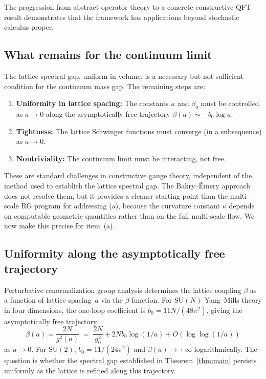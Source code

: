 \documentclass[11pt,a4paper]{article}
\theoremstyle{plain}
\theoremstyle{definition}
\theoremstyle{remark}
\newcommand{\SU}{\mathrm{SU}}
\begin{document}
The progression from abstract operator theory to a concrete
constructive QFT result demonstrates that the framework has
applications beyond stochastic calculus proper.


\subsection{What remains for the continuum limit}

The lattice spectral gap, uniform in volume, is a necessary but not
sufficient condition for the continuum mass gap. The remaining steps
are:
\begin{enumerate}[label=(\alph*)]
\item \textbf{Uniformity in lattice spacing:} The constants $\kappa$
  and $\beta_0$ must be controlled as $a \to 0$ along the
  asymptotically free trajectory $\beta(a) \sim -b_0\log a$.
\item \textbf{Tightness:} The lattice Schwinger functions must
  converge (in a subsequence) as $a \to 0$.
\item \textbf{Nontriviality:} The continuum limit must be
  interacting, not free.
\end{enumerate}

These are standard challenges in constructive gauge theory,
independent of the method used to establish the lattice spectral gap.
The Bakry--\'Emery approach does not resolve them, but it provides a
cleaner starting point than the multi-scale RG program for addressing
(a), because the curvature constant $\kappa$ depends on computable
geometric quantities rather than on the full multi-scale flow.
We now make this precise for item~(a).


\subsection{Uniformity along the asymptotically free trajectory}
\label{ssec:AF}

Perturbative renormalization group analysis determines the lattice
coupling $\beta$ as a function of lattice spacing~$a$ via the
$\beta$-function.  For $\SU(N)$ Yang--Mills theory in four
dimensions, the one-loop coefficient is $b_0 = 11N/(48\pi^2)$,
giving the asymptotically free trajectory
\begin{equation}\label{eq:AF-trajectory}
\beta(a) = \frac{2N}{g^2(a)} \;=\;
\frac{2N}{g_0^2} + 2Nb_0 \log(1/a) + O(\log\log(1/a))
\end{equation}
as $a \to 0$.  For $\SU(2)$, $b_0 = 11/(24\pi^2)$ and
$\beta(a) \to +\infty$ logarithmically.  The question is whether
the spectral gap established in Theorem~\ref{thm:main} persists
uniformly as the lattice is refined along this trajectory.
\end{document}
